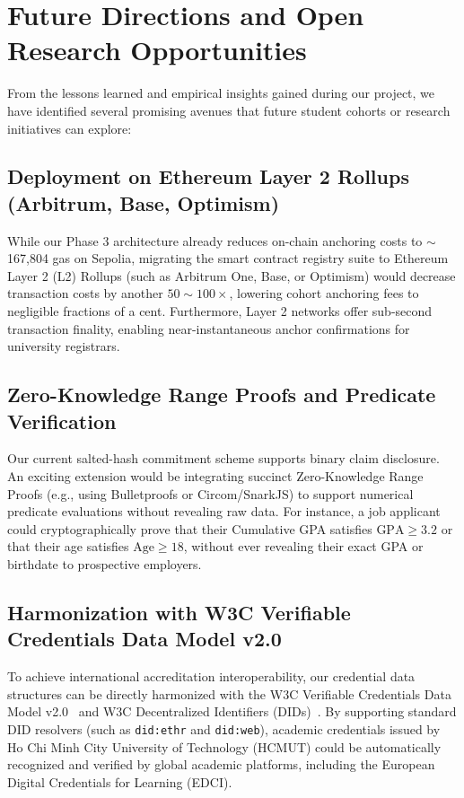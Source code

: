 \section{Future Directions and Open Research Opportunities}

From the lessons learned and empirical insights gained during our project, we have identified several promising avenues that future student cohorts or research initiatives can explore:

\subsection{Deployment on Ethereum Layer 2 Rollups (Arbitrum, Base, Optimism)}
While our Phase 3 architecture already reduces on-chain anchoring costs to $\sim$167,804 gas on Sepolia, migrating the smart contract registry suite to Ethereum Layer 2 (L2) Rollups (such as Arbitrum One, Base, or Optimism) would decrease transaction costs by another $50 \sim 100\times$, lowering cohort anchoring fees to negligible fractions of a cent. Furthermore, Layer 2 networks offer sub-second transaction finality, enabling near-instantaneous anchor confirmations for university registrars.

\subsection{Zero-Knowledge Range Proofs and Predicate Verification}
Our current salted-hash commitment scheme supports binary claim disclosure. An exciting extension would be integrating succinct Zero-Knowledge Range Proofs (e.g., using Bulletproofs or Circom/SnarkJS) to support numerical predicate evaluations without revealing raw data. For instance, a job applicant could cryptographically prove that their Cumulative GPA satisfies $\text{GPA} \ge 3.2$ or that their age satisfies $\text{Age} \ge 18$, without ever revealing their exact GPA or birthdate to prospective employers.

\subsection{Harmonization with W3C Verifiable Credentials Data Model v2.0}
To achieve international accreditation interoperability, our credential data structures can be directly harmonized with the W3C Verifiable Credentials Data Model v2.0~\cite{W3CVC} and W3C Decentralized Identifiers (DIDs)~\cite{w3c_did}. By supporting standard DID resolvers (such as \texttt{did:ethr} and \texttt{did:web}), academic credentials issued by Ho Chi Minh City University of Technology (HCMUT) could be automatically recognized and verified by global academic platforms, including the European Digital Credentials for Learning (EDCI).

